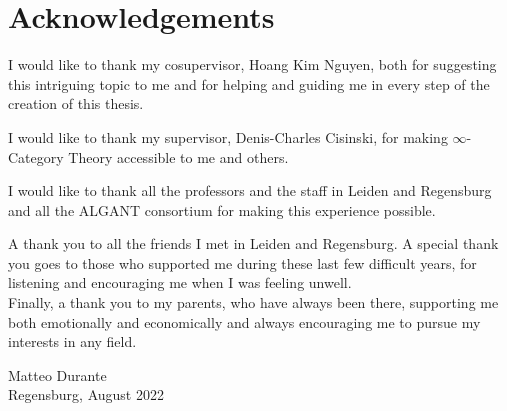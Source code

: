 \chapter*{Acknowledgements}

I would like to thank my cosupervisor, Hoang Kim Nguyen, both for suggesting
this intriguing topic to me and for helping and guiding me in every step of the
creation of this thesis.

I would like to thank my supervisor, Denis-Charles Cisinski, for
making $\infty$-Category Theory accessible to me and others.

I would like to thank all the professors and the staff in Leiden and
Regensburg and all the ALGANT consortium for making this experience
possible.

A thank you to all the friends I met in Leiden and Regensburg. A
special thank you goes to those who supported me during these last few difficult
years, for listening and encouraging me when I was feeling unwell.\\

Finally, a thank you to my parents, who have always been there,
supporting me both emotionally and economically and always encouraging me to
pursue my interests in any field.

\begin{flushright}
	Matteo Durante \\ Regensburg, August 2022
\end{flushright}
